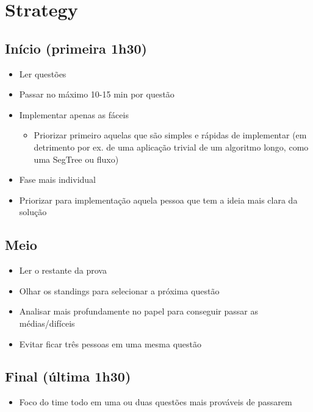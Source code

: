 \pagebreak

\section{Strategy}

\subsection{Início (primeira 1h30)}

\begin{itemize}
	\item Ler questões
	\item Passar no máximo 10-15 min por questão
	\item Implementar apenas as fáceis
	\begin{itemize}
		\item Priorizar primeiro aquelas que são simples e rápidas de implementar
		(em detrimento por ex. de uma aplicação trivial de um algoritmo longo, como uma SegTree ou fluxo)
	\end{itemize}
	\item Fase mais individual
	\item Priorizar para implementação aquela pessoa que tem a ideia mais clara da solução
\end{itemize}

\subsection{Meio}

\begin{itemize}
	\item Ler o restante da prova
	\item Olhar os standings para selecionar a próxima questão
	\item Analisar mais profundamente no papel para conseguir passar as médias/difíceis
	\item Evitar ficar três pessoas em uma mesma questão
\end{itemize}

\subsection{Final (última 1h30)}

\begin{itemize}
	\item Foco do time todo em uma ou duas questões mais prováveis de passarem
\end{itemize}

\pagebreak
